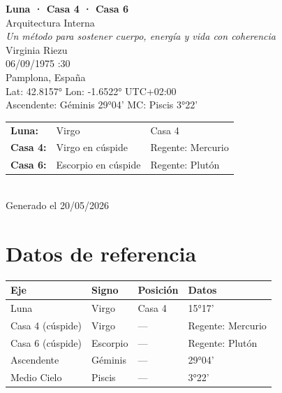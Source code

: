 \documentclass[11pt,a4paper]{article}
\begin{document}
\begin{titlepage}
  \centering
  \vspace*{1.5cm}
  {\Huge\bfseries\color{azulai} Luna · Casa 4 · Casa 6}\\[0.5cm]
  {\large\color{grisai} Arquitectura Interna}\\[0.3cm]
  {\small\itshape\color{grisai} Un método para sostener cuerpo, energía y vida con coherencia}\\[2cm]
  {\huge\color{doradoai} Virginia Riezu}\\[1.5cm]
  {\Large 06/09/1975 :30}\\[0.3cm]
  {\Large Pamplona, España}\\[0.3cm]
  {\normalsize Lat: 42.8157° \quad Lon: -1.6522° \quad UTC+02:00}\\[0.3cm]
  {\normalsize Ascendente: Géminis 29°04' \quad
    MC: Piscis 3°22'}\\[2cm]

  \begin{tabular}{lll}
    \textbf{Luna:} & Virgo & Casa 4 \\
    \textbf{Casa 4:} & Virgo en cúspide & Regente: Mercurio \\
    \textbf{Casa 6:} & Escorpio en cúspide & Regente: Plutón \\
  \end{tabular}\\[2cm]

  \vfill
  {\small Generado el 20/05/2026}
\end{titlepage}

\tableofcontents
\clearpage

\section{Datos de referencia}

\begin{center}
\begin{tabular}{llll}
  \toprule
  \textbf{Eje} & \textbf{Signo} & \textbf{Posición} & \textbf{Datos} \\
  \midrule
  Luna & Virgo & Casa 4 & 15°17' \\
  Casa 4 (cúspide) & Virgo & --- & Regente: Mercurio \\
  Casa 6 (cúspide) & Escorpio & --- & Regente: Plutón \\
  Ascendente & Géminis & --- & 29°04' \\
  Medio Cielo & Piscis & --- & 3°22' \\
  \bottomrule
\end{tabular}
\end{center}
\end{document}
